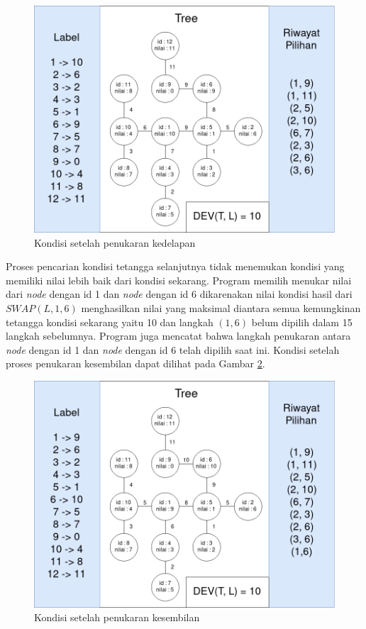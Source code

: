 \begin{figure}[ht]
	\centering\includegraphics[width=1\textwidth]{bab5/figures/uji_coba_9.png}
	\caption{Kondisi setelah penukaran kedelapan}
	\label{fig:uji_coba_9}
\end{figure}

Proses pencarian kondisi tetangga selanjutnya tidak menemukan kondisi yang memiliki nilai lebih baik dari kondisi sekarang. Program memilih menukar nilai dari \textit{node} dengan id 1 dan \textit{node} dengan id 6 dikarenakan nilai kondisi hasil dari $ SWAP(L, 1, 6) $ menghasilkan nilai yang maksimal diantara semua kemungkinan tetangga kondisi sekarang yaitu 10 dan langkah $ (1,6) $ belum dipilih dalam 15 langkah sebelumnya. Program juga mencatat bahwa langkah penukaran antara \textit{node} dengan id 1 dan \textit{node} dengan id 6 telah dipilih saat ini. Kondisi setelah proses penukaran kesembilan dapat dilihat pada Gambar \ref{fig:uji_coba_10}.

\begin{figure}[ht]
	\centering\includegraphics[width=1\textwidth]{bab5/figures/uji_coba_10.png}
	\caption{Kondisi setelah penukaran kesembilan}
	\label{fig:uji_coba_10}
\end{figure}

